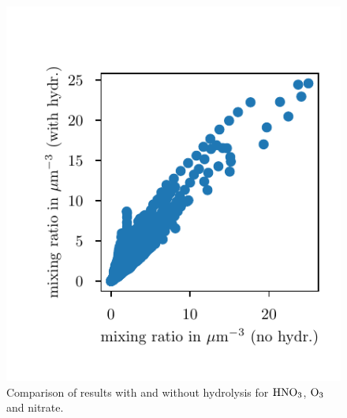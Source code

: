 \documentclass[11pt]{article}
\begin{document}
\begin{figure}
  \includegraphics[scale=0.7]{scatter_no3}
    \caption{Comparison of results with and without hydrolysis for
      $\rm HNO_3$, $\rm O_3$ and nitrate. \label{fig:scatter}}
  \end{figure}

\clearpage \newpage
 
\end{document}
